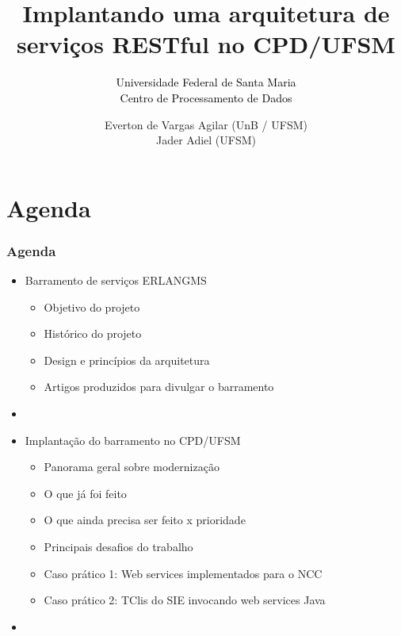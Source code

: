 \documentclass{beamer}
\title{Implantando uma arquitetura de serviços RESTful no CPD/UFSM}
\subtitle{ \textcolor{black}{Universidade Federal de Santa Maria} \\
			\textcolor{black}{\small{Centro de Processamento de Dados}} 
}
\author{Everton de Vargas Agilar (UnB / UFSM) \\
		Jader Adiel (UFSM)
}
\begin{document}
\begin{frame}
  \titlepage
\end{frame}





\section{Agenda}


\begin{frame}
  \frametitle{Agenda}

    \begin{itemize}

	    \item<1-> Barramento de serviços ERLANGMS
		    \begin{itemize}
		  	  \item<1->Objetivo do projeto
	    	  \item<1->Histórico do projeto
  	  	 	  \item<1->Design e princípios da arquitetura
  	  	 	  \item<1->Artigos produzidos para divulgar o barramento
		    \end{itemize}
	   	  \item<1-> 

	    \item<1-> Implantação do barramento no CPD/UFSM
		    \begin{itemize}
	        \item<1->Panorama geral sobre modernização
			\item<1->O que já foi feito
			\item<1->O que ainda precisa ser feito x prioridade
			\item<1->Principais desafios do trabalho
			\item<1->Caso prático 1: Web services implementados para o NCC
			\item<1->Caso prático 2: TClis do SIE invocando web services Java
		    \end{itemize}
   	    \item<1-> 
   	    


	 \end{itemize}	   	  

\end{frame}



\end{document}
